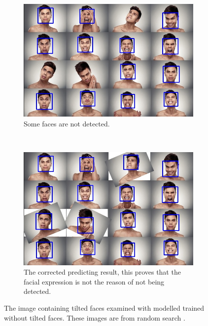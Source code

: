 \documentclass[10pt,twocolumn,letterpaper]{article}
\begin{document}
\begin{figure}[t]
    \centering
    \begin{subfigure}[t]{0.45\textwidth}
        \begin{center}
            \includegraphics[width=0.9\linewidth]{facial1}
        \end{center}
        \caption{Some faces are not detected.}
        \label{fig:tilt}
    \end{subfigure}
	~
    \begin{subfigure}[t]{0.45\textwidth}
        \begin{center}
            \includegraphics[width=0.9\linewidth]{facial1_corrected}
        \end{center}
        \caption{The corrected predicting result, this proves that the facial expression is not the reason of not being detected.}
        \label{fig:tiltcor}
    \end{subfigure}
    \caption{The image containing tilted faces examined with modelled trained without tilted faces. These images are from random search \cite{facialimg}.}
\end{figure}
\end{document}
